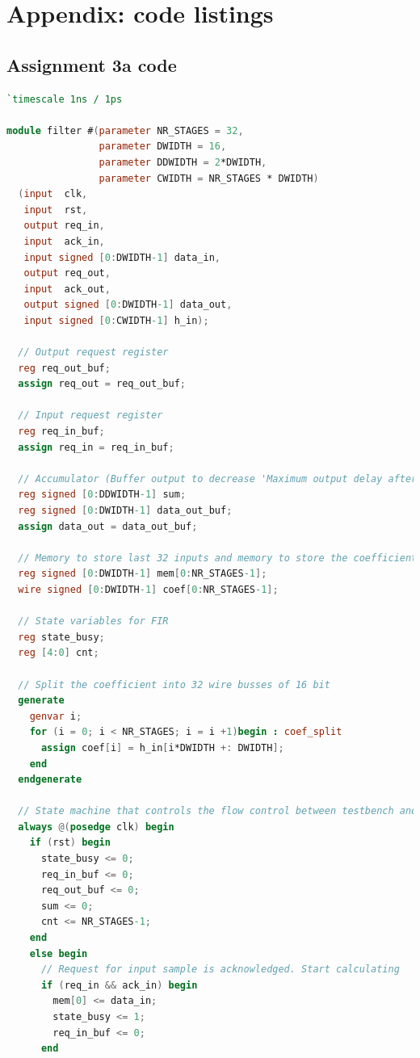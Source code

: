 \documentclass[a4paper,twoside,11pt, fleqn]{article}
\begin{document}
\newpage
\section{Appendix: code listings}

\subsection{Assignment 3a code}
\label{code:3a}

\lstset{ %
	numbers=left
}

\begin{lstlisting}[language=Verilog]
`timescale 1ns / 1ps

module filter #(parameter NR_STAGES = 32,
                parameter DWIDTH = 16,
                parameter DDWIDTH = 2*DWIDTH,
                parameter CWIDTH = NR_STAGES * DWIDTH)
  (input  clk,
   input  rst,
   output req_in,
   input  ack_in,
   input signed [0:DWIDTH-1] data_in,
   output req_out,
   input  ack_out,
   output signed [0:DWIDTH-1] data_out,
   input signed [0:CWIDTH-1] h_in);

  // Output request register
  reg req_out_buf;
  assign req_out = req_out_buf;

  // Input request register
  reg req_in_buf;
  assign req_in = req_in_buf;

  // Accumulator (Buffer output to decrease 'Maximum output delay after clock')
  reg signed [0:DDWIDTH-1] sum;
  reg signed [0:DWIDTH-1] data_out_buf;
  assign data_out = data_out_buf; 

  // Memory to store last 32 inputs and memory to store the coefficients.
  reg signed [0:DWIDTH-1] mem[0:NR_STAGES-1];
  wire signed [0:DWIDTH-1] coef[0:NR_STAGES-1];

  // State variables for FIR
  reg state_busy;
  reg [4:0] cnt;

  // Split the coefficient into 32 wire busses of 16 bit
  generate
    genvar i;
    for (i = 0; i < NR_STAGES; i = i +1)begin : coef_split
      assign coef[i] = h_in[i*DWIDTH +: DWIDTH];
    end
  endgenerate

  // State machine that controls the flow control between testbench and filter
  always @(posedge clk) begin
    if (rst) begin
      state_busy <= 0;
      req_in_buf <= 0;
      req_out_buf <= 0;
      sum <= 0;
      cnt <= NR_STAGES-1;
    end
    else begin
      // Request for input sample is acknowledged. Start calculating
      if (req_in && ack_in) begin
        mem[0] <= data_in;
        state_busy <= 1;
        req_in_buf <= 0;
      end


\end{lstlisting}
\end{document}
